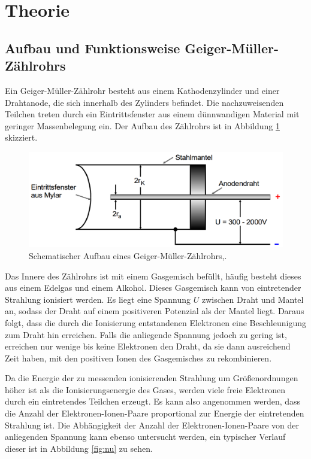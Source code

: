 \section{Theorie}
\label{sec:Theorie}
\subsection{Aufbau und Funktionsweise Geiger-Müller-Zählrohrs}
\label{subsec:theorie1}
Ein Geiger-Müller-Zählrohr besteht aus einem Kathodenzylinder und einer Drahtanode, die sich
innerhalb des Zylinders befindet. Die nachzuweisenden Teilchen treten durch ein Eintrittsfenster
aus einem dünnwandigen Material mit geringer Massenbelegung ein.
Der Aufbau des Zählrohrs ist in Abbildung \ref{fig:zaehlrohrskizze}
skizziert.

\begin{figure}
  \centering
  \includegraphics[width=\textwidth]{data/zaehlrohrskizze.png}
  \caption{Schematischer Aufbau eines Geiger-Müller-Zählrohrs,\cite{Versuchsanleitung}.}
  \label{fig:zaehlrohrskizze}
\end{figure}

Das Innere des Zählrohrs ist mit einem Gasgemisch befüllt, häufig besteht dieses aus einem Edelgas und einem Alkohol.
Dieses Gasgemisch kann von eintretender Strahlung ionisiert werden.
Es liegt eine Spannung $U$ zwischen Draht und Mantel an, sodass der Draht auf einem positiveren Potenzial als
der Mantel liegt. Daraus folgt, dass die durch die Ionisierung entstandenen Elektronen
eine Beschleunigung zum Draht hin erreichen. Falls die anliegende Spannung jedoch
zu gering ist, erreichen nur wenige bis keine Elektronen den Draht, da sie dann ausreichend
Zeit haben, mit den positiven Ionen des Gasgemisches zu rekombinieren.

Da die Energie der zu messenden ionisierenden Strahlung um Größenordnungen höher
ist als die Ionisierungsenergie des Gases, werden viele freie Elektronen durch ein eintretendes
Teilchen erzeugt. Es kann also angenommen werden, dass die Anzahl der Elektronen-Ionen-Paare
proportional zur Energie der eintretenden Strahlung ist. Die Abhängigkeit der Anzahl der Elektronen-Ionen-Paare
von der anliegenden Spannung kann ebenso untersucht werden, ein typischer
Verlauf dieser ist in Abbildung \ref{fig:nu} zu sehen.

